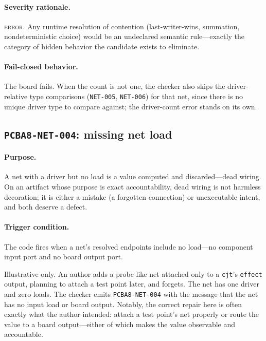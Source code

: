 \paragraph{Severity rationale.} \textsc{error}. Any runtime resolution of contention (last-writer-wins, summation, nondeterministic choice) would be an undeclared semantic rule---exactly the category of hidden behavior the candidate exists to eliminate.

\paragraph{Fail-closed behavior.} The board fails. When the count is not one, the checker also skips the driver-relative type comparisons (\texttt{NET-005}, \texttt{NET-006}) for that net, since there is no unique driver type to compare against; the driver-count error stands on its own.

\subsection{\texttt{PCBA8-NET-004}: missing net load}\label{ch07:sub:net004}

\paragraph{Purpose.} A net with a driver but no load is a value computed and discarded---dead wiring. On an artifact whose purpose is exact accountability, dead wiring is not harmless decoration; it is either a mistake (a forgotten connection) or unexecutable intent, and both deserve a defect.

\paragraph{Trigger condition.} The code fires when a net's resolved endpoints include no load---no component input port and no board output port.

\begin{example}\label{ch07:ex:net004}
Illustrative only. An author adds a probe-like net attached only to a \texttt{cjt}'s \texttt{effect} output, planning to attach a test point later, and forgets. The net has one driver and zero loads. The checker emits \texttt{PCBA8-NET-004} with the message that the net has no input load or board output. Notably, the correct repair here is often exactly what the author intended: attach a test point's net properly or route the value to a board output---either of which makes the value observable and accountable.
\end{example}

